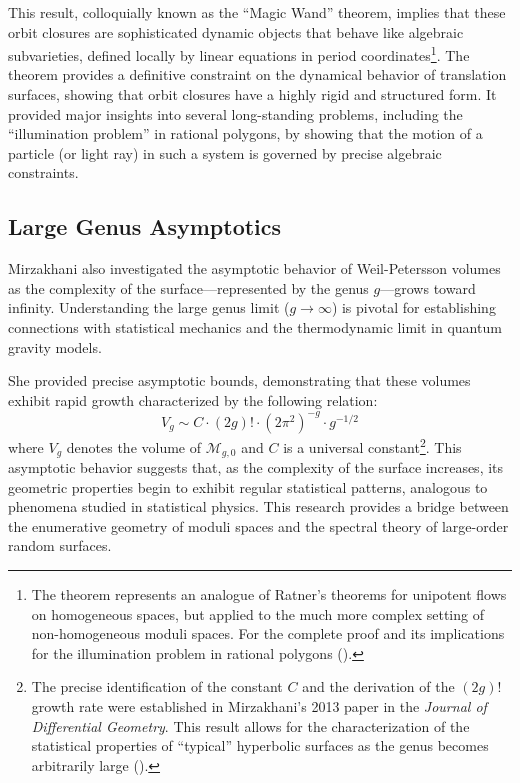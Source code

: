 This result, colloquially known as the ``Magic Wand'' theorem, implies that these orbit closures are sophisticated dynamic objects that behave like algebraic subvarieties, defined locally by linear equations in period coordinates\footnote{The theorem represents an analogue of Ratner's theorems for unipotent flows on homogeneous spaces, but applied to the much more complex setting of non-homogeneous moduli spaces. For the complete proof and its implications for the illumination problem in rational polygons (\cite{Eskin2015}).}. 
The theorem provides a definitive constraint on the dynamical behavior of translation surfaces, showing that orbit closures have a highly rigid and structured form. It provided major insights into several long-standing problems, including the ``illumination problem'' in rational polygons, by showing that the motion of a particle (or light ray) in such a system is governed by precise algebraic constraints.

\subsection{Large Genus Asymptotics}

Mirzakhani also investigated the asymptotic behavior of Weil-Petersson volumes as the complexity of the surface—represented by the genus $g$—grows toward infinity. Understanding the large genus limit ($g \to \infty$) is pivotal for establishing connections with statistical mechanics and the thermodynamic limit in quantum gravity models.

She provided precise asymptotic bounds, demonstrating that these volumes exhibit rapid growth characterized by the following relation:
\begin{equation}
    V_g \sim C \cdot (2g)! \cdot (2\pi^2)^{-g} \cdot g^{-1/2}
\end{equation}
where $V_g$ denotes the volume of $\mathcal{M}_{g,0}$ and $C$ is a universal constant\footnote{The precise identification of the constant $C$ and the derivation of the $(2g)!$ growth rate were established in Mirzakhani's 2013 paper in the \textit{Journal of Differential Geometry}. This result allows for the characterization of the statistical properties of ``typical'' hyperbolic surfaces as the genus becomes arbitrarily large (\cite{Mirzakhani2013}).}.
This asymptotic behavior suggests that, as the complexity of the surface increases, its geometric properties begin to exhibit regular statistical patterns, analogous to phenomena studied in statistical physics.
This research provides a bridge between the enumerative geometry of moduli spaces and the spectral theory of large-order random surfaces.

